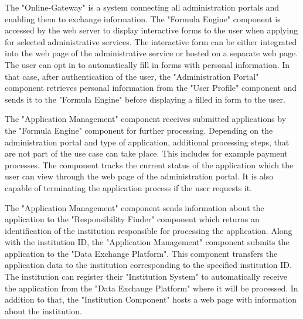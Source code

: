 The "Online-Gateway" is a system connecting all administration portals and enabling them to exchange information. The "Formula Engine" component is accessed by the web server to display interactive forms to the user when applying for selected administrative services. The interactive form can be either integrated into the web page of the administrative service or hosted on a separate web page. The user can opt in to automatically fill in forms with personal information. In that case, after authentication of the user, the "Administration Portal" component retrieves personal information from the "User Profile" component and sends it to the "Formula Engine" before displaying a filled in form to the user. 

The "Application Management" component receives submitted applications by the "Formula Engine" component for further processing. Depending on the administration portal and type of application, additional processing steps, that are not part of the use case can take place. This includes for example payment processes. The component tracks the current status of the application which the user can view through the web page of the administration portal. It is also capable of terminating the application process if the user requests it. 

The "Application Management" component sends information about the application to the "Responsibility Finder" component which returns an identification of the institution responsible for processing the application. Along with the institution ID, the "Application Management" component submits the application to the "Data Exchange Platform". This component transfers the application data to the institution corresponding to the specified institution ID. The institution can register their "Institution System" to automatically receive the application from the "Data Exchange Platform" where it will be processed. In addition to that, the "Institution Component" hosts a web page with information about the institution.
